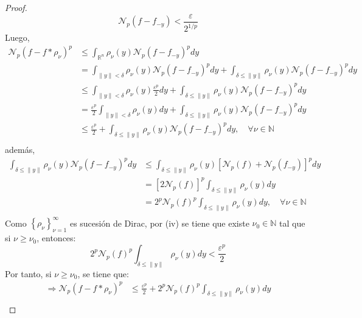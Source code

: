 \documentclass[12pt]{report}
\theoremstyle{largebreak}
\newcommand\norm[1]{\ensuremath{\|#1\|}}
\newcommand{\N}[2]{\ensuremath{\mathcal{N}_{#1}\left(#2\right)}}
\begin{document}
\begin{proof}
        \begin{equation*}
            \N{p}{f-f_{-y}}<\frac{\varepsilon}{2^{1/p}}
        \end{equation*}
        Luego,
        \begin{equation*}
            \begin{split}
                \N{p}{f-f*\rho_\nu}^p&\leq\int_{\mathbb{R}^n}\rho_\nu(y)\N{p}{f-f_{-y}}^pdy\\
                &=\int_{\norm{y}<\delta}\rho_\nu(y)\N{p}{f-f_{-y}}^pdy+\int_{\delta\leq\norm{y}}\rho_\nu(y)\N{p}{f-f_{-y}}^pdy\\
                &\leq\int_{\norm{y}<\delta}\rho_\nu(y)\frac{\varepsilon^p}{2}dy+\int_{\delta\leq\norm{y}}\rho_\nu(y)\N{p}{f-f_{-y}}^pdy\\
                &=\frac{\varepsilon^p}{2}\int_{\norm{y}<\delta}\rho_\nu(y)dy+\int_{\delta\leq\norm{y}}\rho_\nu(y)\N{p}{f-f_{-y}}^pdy\\
                &\leq\frac{\varepsilon^p}{2}+\int_{\delta\leq\norm{y}}\rho_\nu(y)\N{p}{f-f_{-y}}^pdy,\quad\forall\nu\in\mathbb{N}\\
            \end{split}
        \end{equation*}
        además,
        \begin{equation*}
            \begin{split}
                \int_{\delta\leq\norm{y}}\rho_\nu(y)\N{p}{f-f_{-y}}^pdy&\leq\int_{\delta\leq\norm{y}}\rho_\nu(y)\left[\N{p}{f}+\N{p}{f_{-y}}\right]^pdy\\
                &=\left[2\N{p}{f}\right]^p\int_{\delta\leq\norm{y}}\rho_\nu(y)dy\\
                &=2^p\N{p}{f}^p\int_{\delta\leq\norm{y}}\rho_\nu(y)dy,\quad\forall\nu\in\mathbb{N} \\
            \end{split}
        \end{equation*}
        Como $\left\{\rho_\nu \right\}_{\nu=1}^\infty$ es sucesión de Dirac, por (iv) se tiene que existe $\nu_0\in\mathbb{N}$ tal que si $\nu\geq\nu_0$, entonces:
        \begin{equation*}
            2^p\N{p}{f}^p\int_{\delta\leq\norm{y}}\rho_\nu(y)dy<\frac{\varepsilon^p}{2}
        \end{equation*}
        Por tanto, si $\nu\geq\nu_0$, se tiene que:
        \begin{equation*}
            \begin{split}
                \Rightarrow \N{p}{f-f*\rho_\nu}^p&\leq\frac{\varepsilon^p}{2}+2^p\N{p}{f}^p\int_{\delta\leq\norm{y}}\rho_\nu(y)dy\\

\end{split}
\end{equation*}
\end{proof}
\end{document}
